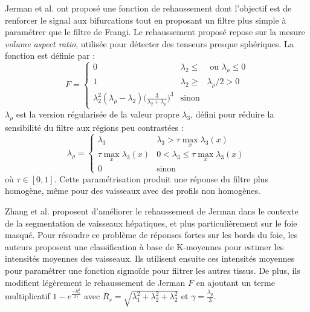 
Jerman et al. ont proposé une fonction de rehaussement dont l'objectif est de renforcer le signal aux bifurcations tout en proposant un filtre plus simple à paramétrer que le filtre de Frangi. Le rehaussement proposé repose sur la mesure \textit{volume aspect ratio}, utilisée pour détecter des tenseurs presque sphériques. La fonction est définie par :
\begin{equation}
\nonumber
  F =
\left\{
  \begin{array}{lll}
    0 & \lambda_2 \leqslant & \textrm{~ou~} \lambda_\rho \leqslant 0 \\
    1 & \lambda_2 \geqslant & \lambda_\rho / 2 > 0 \\
    \lambda_{2}^2(\lambda_\rho -\lambda_2)\big(\frac{3}{\lambda_2+\lambda_\rho}\big)^3 & \textrm{sinon} &
  \end{array}
  \right. 
\end{equation}
$\lambda_\rho$ est la version régularisée de la valeur propre $\lambda_3$, défini pour réduire la sensibilité du filtre aux régions peu contrastées :
\begin{equation}
\nonumber
  \lambda_\rho =
  \left\{
  \begin{array}{ll}
     \lambda_3  & \lambda_3 > \tau \max_{x} \lambda_3(x) \\
    \tau \max_{x} \lambda_3(x) & 0 < \lambda_3 \leqslant \tau \max_{x} \lambda_3(x) \\
    0  & \textrm{sinon}
  \end{array}
\right.
\end{equation}
où $\tau \in [0,1]$. Cette paramétrisation produit une réponse du filtre plus homogène, même pour des vaisseaux avec des profils non homogènes.


Zhang et al. \cite{Zhang2018_liver_fuzzy_connectedness} proposent d'améliorer le rehaussement de Jerman dans le contexte de la segmentation de vaisseaux hépatiques, et plus particulièrement sur le foie masqué. Pour résoudre ce problème de réponses fortes sur les bords du foie, les auteurs proposent une classification à base de K-moyennes pour estimer les intensités moyennes des vaisseaux. Ils utilisent ensuite ces intensités moyennes pour paramétrer une fonction sigmoïde pour filtrer les autres tissus. De plus, ils modifient légèrement le rehaussement de Jerman $F$ en ajoutant un terme multiplicatif $1-e^{ \frac{-R^2_s}{2 \gamma}}$ avec $R_s = \sqrt{\lambda^2_1 + \lambda^2_2 + \lambda^2_2}$ et $\gamma= \frac{\lambda_p}{3}$.

